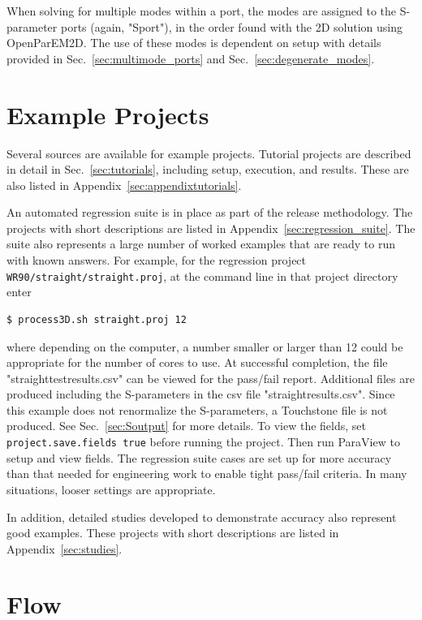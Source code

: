 \documentclass[titlepage]{article}
\renewcommand\_{\textunderscore\linebreak[1]}
\begin{document}
When solving for multiple modes within a port, the modes are assigned to the S-parameter ports (again, "Sport"), in the order found with the 2D solution using OpenParEM2D.  The use of these modes is dependent on setup with details provided in Sec.~\ref{sec:multimode_ports} and Sec.~\ref{sec:degenerate_modes}.

\section{Example Projects}

Several sources are available for example projects.  Tutorial projects are described in detail in Sec.~\ref{sec:tutorials}, including setup, execution, and results.  These are also listed in Appendix~\ref{sec:appendixtutorials}.

An automated regression suite is in place as part of the release methodology. The projects with short descriptions are listed in Appendix~\ref{sec:regression_suite}.  The suite also represents a large number of worked examples that are ready to run with known answers.  For example, for the regression project \verb+WR90/straight/straight.proj+, at the command line in that project directory enter
\begin{Verbatim}[fontsize=\small]
   $ process3D.sh straight.proj 12
\end{Verbatim}
where depending on the computer, a number smaller or larger than 12 could be appropriate for the number of cores to use.  At successful completion, the file "straight\_test\_results.csv" can be viewed for the pass/fail report.  Additional files are produced including the S-parameters in the csv file "straight\_results.csv".  Since this example does not renormalize the S-parameters, a Touchstone file is not produced.  See Sec.~\ref{sec:Soutput} for more details.  To view the fields, set \texttt{project.save.fields true} before running the project.  Then run ParaView to setup and view fields.
The regression suite cases are set up for more accuracy than that needed for engineering work to enable tight pass/fail criteria.  In many situations, looser settings are appropriate.

In addition, detailed studies developed to demonstrate accuracy also represent good examples.  These projects with short descriptions are listed in Appendix~\ref{sec:studies}.

\section{Flow}
\end{document}
